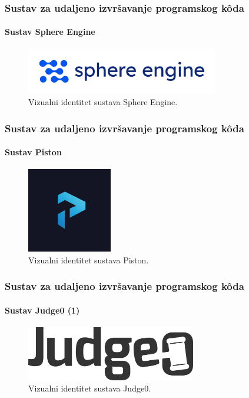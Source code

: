 \documentclass{beamer}
\begin{document}
\begin{frame}
\frametitle{Sustav za udaljeno izvršavanje programskog kôda}
\framesubtitle{Sustav Sphere Engine}
\begin{figure}[htb]
	\centering
	\includegraphics[width=0.75\textwidth]{images/Sphere Engine Logo.png}
	\caption{
		Vizualni identitet sustava Sphere Engine. \citep{SphereEngine}
	}
\end{figure}
\end{frame}

\begin{frame}
\frametitle{Sustav za udaljeno izvršavanje programskog kôda}
\framesubtitle{Sustav Piston}
\begin{figure}[htb]
	\centering
	\includegraphics[width=0.33\textwidth]{images/Piston Logo.png}
	\caption{
		Vizualni identitet sustava Piston. \citep{Piston}
	}
\end{figure}
\end{frame}

\begin{frame}
\frametitle{Sustav za udaljeno izvršavanje programskog kôda}
\framesubtitle{Sustav Judge0 (1)}
\begin{figure}[htb]
	\centering
	\includegraphics[width=0.66\textwidth]{images/Judge0 Logo.png}
	\caption[]{
		Vizualni identitet sustava Judge0.
	}
\end{figure}
\end{frame}
\end{document}
